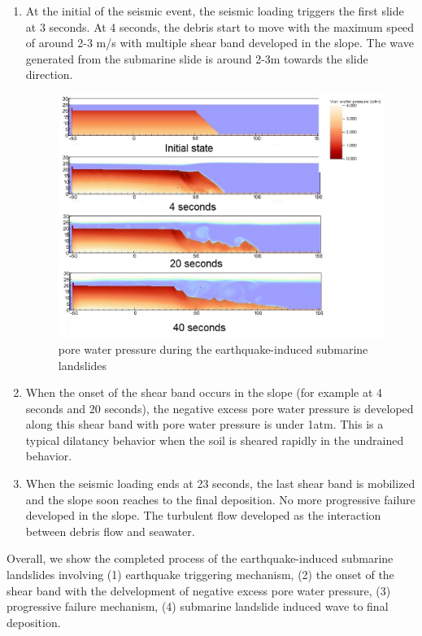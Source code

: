 \documentclass[preprint,12pt]{elsarticle}
\begin{document}
\begin{enumerate}
\item At the initial of the seismic event, the seismic loading triggers the first slide at 3 seconds. At 4 seconds, the debris start to move with the maximum speed of around 2-3 m/s with multiple shear band developed in the slope. The wave generated from the submarine slide is around 2-3m towards the slide direction.
%
\begin{figure}[H]
\center
\includegraphics[scale=0.5]{PWP.jpeg}
\caption{pore water pressure during the earthquake-induced submarine landslides}
\label{fig:PWP}
\end {figure}
%
%
\item When the onset of the shear band occurs in the slope (for example at 4 seconds and 20 seconds), the negative excess pore water pressure is developed along this shear band with pore water pressure is under 1atm. This is a typical dilatancy behavior when the soil is sheared rapidly in the undrained behavior. 
\item  When the seismic loading ends at 23 seconds, the last shear band is mobilized and the slope soon reaches to the final deposition. No more progressive failure developed in the slope. The turbulent flow developed as the interaction between debris flow and seawater.
\end {enumerate}
%
Overall, we show the completed process of the earthquake-induced submarine landslides involving (1) earthquake triggering mechanism, (2) the onset of the shear band with the delvelopment of negative excess pore water pressure, (3) progressive failure mechanism, (4) submarine landslide induced wave to final deposition.
\end{document}
